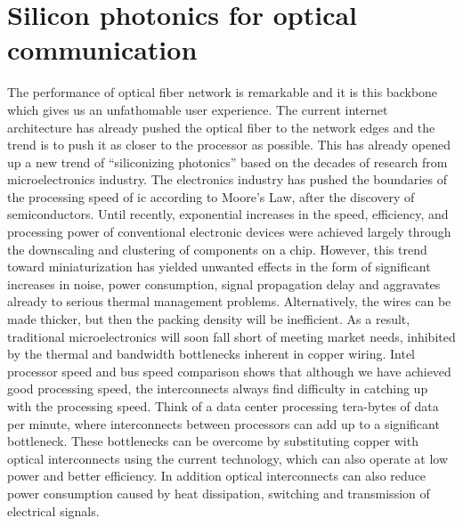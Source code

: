 \documentclass[../report.tex]{subfiles}
\begin{document}
	\section{Silicon photonics for optical communication}
The performance of optical fiber network is remarkable and it is this backbone which gives us an unfathomable user experience. The current internet architecture has already pushed the optical fiber to the network edges and the trend is to push it as closer to the processor as possible. This has already opened up a new trend of “siliconizing photonics” \cite{silicon_photonics} based on the decades of research from microelectronics industry. The electronics industry has pushed the boundaries of the processing speed of \gls{ic} according to Moore’s Law, after the discovery of semiconductors. Until recently, exponential increases in the speed, efficiency, and processing power of conventional electronic devices were achieved largely through the downscaling and clustering of components on a chip. However, this trend toward miniaturization has yielded unwanted effects in the form of significant increases in noise, power consumption, signal propagation delay and aggravates already to serious thermal management problems. Alternatively, the wires can be made thicker, but then the packing density will be inefficient. As a result, traditional microelectronics will soon fall short of meeting market needs, inhibited by the thermal and bandwidth bottlenecks inherent in copper wiring. Intel processor speed and bus speed comparison \cite{intel_proc_compare} shows that although we have achieved good processing speed, the interconnects always find difficulty in catching up with the processing speed. Think of a data center processing tera-bytes of data per minute, where interconnects between processors can add up to a significant bottleneck. These bottlenecks can be overcome by substituting copper with optical interconnects using the current technology, which can also operate at low power and better efficiency. In addition optical interconnects can also reduce power consumption caused by heat dissipation, switching and transmission of electrical signals.\par
\end{document}
